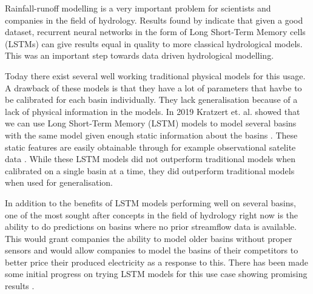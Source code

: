 Rainfall-runoff modelling is a very important problem for scientists and 
companies in the field of hydrology.
Results found by \cite{lstm_first_paper} indicate that given a good dataset,
recurrent neural networks in the form of Long Short-Term Memory cells (LSTMs)
can give results equal in quality to more classical hydrological models.
This was an important step towards data driven hydrological modelling. 

Today there exist several well working traditional physical models for this usage. \citationneeded
A drawback of these models is that they have a lot of parameters that havbe to be 
calibrated for each basin individually. They lack generalisation because of a lack of 
physical information in the models. \citationneeded In 2019 Kratzert et. al. showed
that we can use Long Short-Term Memory (LSTM) models to model several basins with the same model
given enough static information about the basins \cite{lstm_second_paper}. These 
static features are easily obtainable through for example observational satelite 
data \cite{CAMELS_US}. While these LSTM models did not outperform traditional models when calibrated on a single basin at 
a time, they did outperform traditional models when used for generalisation.

In addition to the benefits of LSTM models performing well on several basins, 
one of the most sought after concepts in the field of hydrology right now is the 
ability to do predictions on basins where no prior streamflow data is available. \citationneeded
This would grant companies the ability to model older basins without proper sensors
and would allow companies to model the basins of their competitors to better price 
their produced electricity as a response to this. There has been made some initial 
progress on trying LSTM models for this use case showing promising results \cite{lstm_third_paper}.

